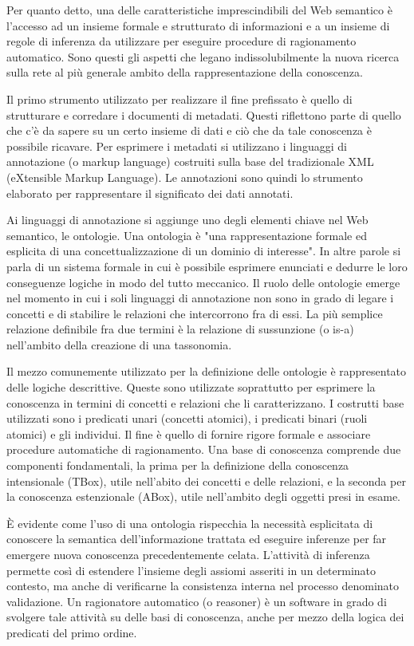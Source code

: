\documentclass[Lau,binding=0.6cm,noexaminfo,oneside]{sapthesis}
\begin{document}
Per quanto detto, una delle caratteristiche imprescindibili del Web semantico è l'accesso ad un insieme formale e strutturato di informazioni e a un insieme di regole di inferenza da utilizzare per eseguire procedure di ragionamento automatico.
Sono questi gli aspetti che legano indissolubilmente la nuova ricerca sulla rete al più generale ambito della rappresentazione della conoscenza.\medskip

Il primo strumento utilizzato per realizzare il fine prefissato è quello di strutturare e corredare i documenti di metadati. Questi riflettono parte di quello che c'è da sapere su un certo insieme di dati e ciò che da tale conoscenza è possibile ricavare.
Per esprimere i metadati si utilizzano i linguaggi di annotazione (o markup language) costruiti sulla base del tradizionale XML (eXtensible Markup Language). Le annotazioni sono quindi lo strumento elaborato per rappresentare il significato dei dati annotati.\medskip

Ai linguaggi di annotazione si aggiunge uno degli elementi chiave nel Web semantico, le ontologie. Una ontologia è "una rappresentazione formale ed esplicita di una concettualizzazione di un dominio di interesse". In altre parole si parla di un sistema formale in cui è possibile esprimere enunciati e dedurre le loro conseguenze logiche in modo del tutto meccanico.
Il ruolo delle ontologie emerge nel momento in cui i soli linguaggi di annotazione non sono in grado di legare i concetti e di stabilire le relazioni che intercorrono fra di essi. La più semplice relazione definibile fra due termini è la relazione di sussunzione (o is-a) nell'ambito della creazione di una tassonomia.\medskip

Il mezzo comunemente utilizzato per la definizione delle ontologie è rappresentato delle logiche descrittive. Queste sono utilizzate soprattutto per esprimere la conoscenza in termini di concetti e relazioni che li caratterizzano. I costrutti base utilizzati sono i predicati unari (concetti atomici), i predicati binari (ruoli atomici) e gli individui.
Il fine è quello di fornire rigore formale e associare procedure automatiche di ragionamento. Una base di conoscenza comprende due componenti fondamentali, la prima per la definizione della conoscenza intensionale (TBox), utile nell'abito dei concetti e delle relazioni, e la seconda per la conoscenza estenzionale (ABox), utile nell'ambito degli oggetti presi in esame.\medskip

\MakeUppercase{è} evidente come l'uso di una ontologia rispecchia la necessità esplicitata di conoscere la semantica dell'informazione trattata ed eseguire inferenze per far emergere nuova conoscenza precedentemente celata.
L'attività di inferenza permette così di estendere l'insieme degli assiomi asseriti in un determinato contesto, ma anche di verificarne la consistenza interna nel processo denominato validazione. Un ragionatore automatico (o reasoner) è un software in grado di svolgere tale attività su delle basi di conoscenza, anche per mezzo della logica dei predicati del primo ordine.\medskip
\end{document}
